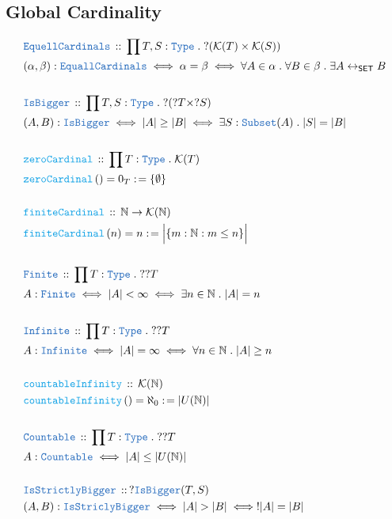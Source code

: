 \documentclass[12pt]{scrartcl}
\newcommand{\TYPE}[1]{\textcolor{NavyBlue}{\mathtt{#1}}}
\newcommand{\FUNC}[1]{\textcolor{Cerulean}{\mathtt{#1}}}
\renewcommand{\.}{\; . \;}
\newcommand{\de}{: \kern 0.1pc =}
\newcommand{\Act}[1]{\left( #1 \right)}
\newcommand{\DeclareType}[2]{& \TYPE{#1} \, :: \, #2 \\}
\newcommand{\DefineType}[3]{& #1 : \TYPE{#2} \iff #3 \\}
\newcommand{\DefineNamedType}[4]{& #1 : \TYPE{#2} \iff #3 \iff #4 \\}
\newcommand{\DeclareFunc}[2]{& \FUNC{#1} \, :: \, #2 \\}
\newcommand{\DefineNamedFunc}[4]{&  \FUNC{#1}\Act{#2} = #3 \de #4 \\}
\newcommand{\Page}[1]{ \begin{align*} #1 \end{align*}   }
\newcommand{\Type}{\TYPE{Type}}
\newcommand{\Nat}{\mathbb{N} }
\newcommand{\ToBij}{\leftrightarrow}
\newcommand{\SET}{\mathsf{SET}}
\begin{document}
\subsection{Global Cardinality}
\Page{
	\DeclareType{EquellCardinals}{ \prod T,S : \Type \. ?(\mathcal{K}(T) \times \mathcal{K}(S))  }
	\DefineNamedType{(\alpha,\beta)}{EquallCardinals}{ \alpha = \beta  }
	{ \forall A \in \alpha \. \forall B \in \beta \. \exists A \ToBij_{\SET} B }
	\\
	\DeclareType{IsBigger}{\prod T,S : \Type \. ?(?T \times ?S)}
	\DefineNamedType{(A,B)}{IsBigger}{|A| \ge |B|}{ \exists S : \TYPE{Subset}(A) \. |S| = |B| }
	\\
	\DeclareFunc{zeroCardinal}{\prod T : \Type \. \mathcal{K}(T)}
	\DefineNamedFunc{zeroCardinal}{}{0_T}{\{ \emptyset \}}
	\\
	\DeclareFunc{finiteCardinal}{ \Nat \to \mathcal{K}(\Nat)  }
	\DefineNamedFunc{finiteCardinal}{n}{n}{\Big| \{  m : \Nat : m \le n   \} \Big|}
	\\
	\DeclareType{Finite}{\prod T : \Type \. ??T}
	\DefineNamedType{A}{Finite}{|A| < \infty }{\exists n \in \Nat \. |A| = n}
	\\
	\DeclareType{Infinite}{\prod T : \Type \. ??T}
	\DefineNamedType{A}{Infinite}{|A| = \infty}{\forall n \in \Nat \. |A| \ge n}
	\\
	\DeclareFunc{countableInfinity}{\mathcal{K}(\Nat)}
	\DefineNamedFunc{countableInfinity}{}{\aleph_0}{|U(\Nat)|}
	\\
	\DeclareType{Countable}{\prod T : \Type \. ??T}
	\DefineType{A}{Countable}{ |A| \le |U(\Nat)|  }
	\\
	\DeclareType{IsStrictlyBigger}{ ? \TYPE{IsBigger}(T,S)}
	\DefineNamedType{(A,B)}{IsStriclyBigger}{|A| > |B|}{!|A| = |B|}
}
\end{document}
